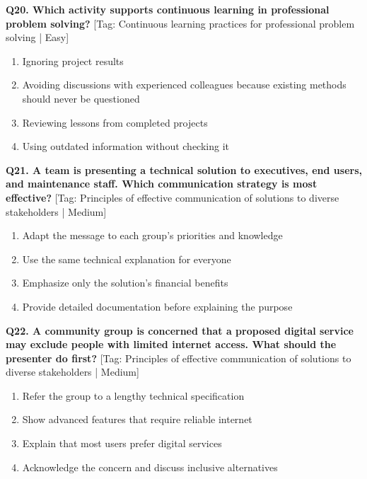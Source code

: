 \noindent\textbf{Q20. Which activity supports continuous learning in professional problem solving?} \hfill [Tag: Continuous learning practices for professional problem solving | Easy]
\begin{enumerate}[label=(\alph*),topsep=2pt,itemsep=1pt,partopsep=0pt,parsep=0pt]
    \item {Ignoring project results}
    \item {Avoiding discussions with experienced colleagues because existing methods should never be questioned}
    \item {Reviewing lessons from completed projects}
    \item {Using outdated information without checking it}
\end{enumerate}
\vspace{2mm}

\noindent\textbf{Q21. A team is presenting a technical solution to executives, end users, and maintenance staff. Which communication strategy is most effective?} \hfill [Tag: Principles of effective communication of solutions to diverse stakeholders | Medium]
\begin{enumerate}[label=(\alph*),topsep=2pt,itemsep=1pt,partopsep=0pt,parsep=0pt]
    \item {Adapt the message to each group's priorities and knowledge}
    \item {Use the same technical explanation for everyone}
    \item {Emphasize only the solution's financial benefits}
    \item {Provide detailed documentation before explaining the purpose}
\end{enumerate}
\vspace{2mm}

\noindent\textbf{Q22. A community group is concerned that a proposed digital service may exclude people with limited internet access. What should the presenter do first?} \hfill [Tag: Principles of effective communication of solutions to diverse stakeholders | Medium]
\begin{enumerate}[label=(\alph*),topsep=2pt,itemsep=1pt,partopsep=0pt,parsep=0pt]
    \item {Refer the group to a lengthy technical specification}
    \item {Show advanced features that require reliable internet}
    \item {Explain that most users prefer digital services}
    \item {Acknowledge the concern and discuss inclusive alternatives}
\end{enumerate}
\vspace{2mm}

